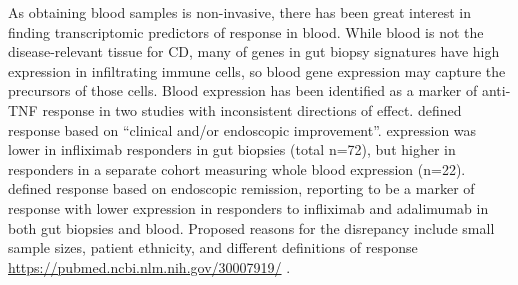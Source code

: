 \begin{outline}
As obtaining blood samples is non-invasive, there has been great interest in finding transcriptomic predictors of response in blood.
%
While blood is not the disease-relevant tissue for \gls{CD},
many of genes in gut biopsy signatures have high expression in infiltrating immune cells, so blood gene expression may capture the precursors of those cells\autocite{gaujoux2019CellcentredMetaanalysisReveals}.
Blood  expression has been identified as a marker of anti-\gls{TNF} response in two studies with inconsistent directions of effect.
\textcite{gaujoux2019CellcentredMetaanalysisReveals} defined response based on  
\enquote{clinical and/or endoscopic improvement}.
 expression was lower in infliximab responders in gut biopsies (total n=72),
but higher in responders in a separate cohort measuring whole blood expression (n=22).
\textcite{verstockt2019LowTREM1Expression} defined response based on endoscopic remission, reporting  to be a marker of response 
with lower expression in responders to infliximab and adalimumab in both gut biopsies and blood.
Proposed reasons for the disrepancy include small sample sizes, patient ethnicity, and different definitions of response \url{https://pubmed.ncbi.nlm.nih.gov/30007919/} \autocite{digby-bell2019InterrogatingHostImmunity}.


\end{outline}
